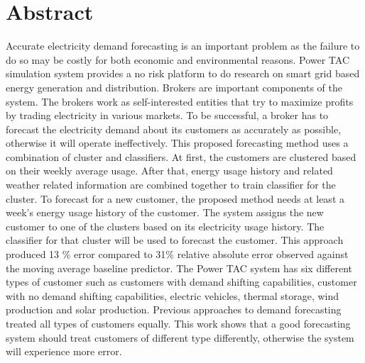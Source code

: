 

\chapter*{Abstract}

Accurate electricity demand forecasting is an important problem as the failure to do so may be costly for both economic and environmental reasons. Power TAC simulation system provides a no risk platform to do research on smart grid based energy generation and distribution. Brokers are important components of the system. The brokers work as self-interested entities that try to maximize profits by trading electricity in various markets. To be successful, a broker has to forecast  the electricity demand about its customers as accurately as possible, otherwise it will operate ineffectively. This proposed forecasting method uses a combination of cluster and classifiers. At first, the customers are clustered based on their weekly average usage. After that, energy usage history and related weather related information are combined together to train classifier for the cluster. To forecast for a new customer, the proposed method needs at least a week's energy usage history of the customer. The system assigns the  new customer to one of the clusters based on its electricity usage history. The classifier for that cluster will be used to forecast the customer. This approach produced 13 \% error compared to 31\% relative absolute error observed against the moving average baseline predictor. The Power TAC system has six different types of customer such as customers with demand shifting capabilities, customer with no demand shifting capabilities, electric vehicles, thermal storage, wind production and solar production. Previous approaches to demand forecasting treated all types of customers equally. This work shows that a good forecasting system should treat customers of different type differently, otherwise the system will experience more error.
